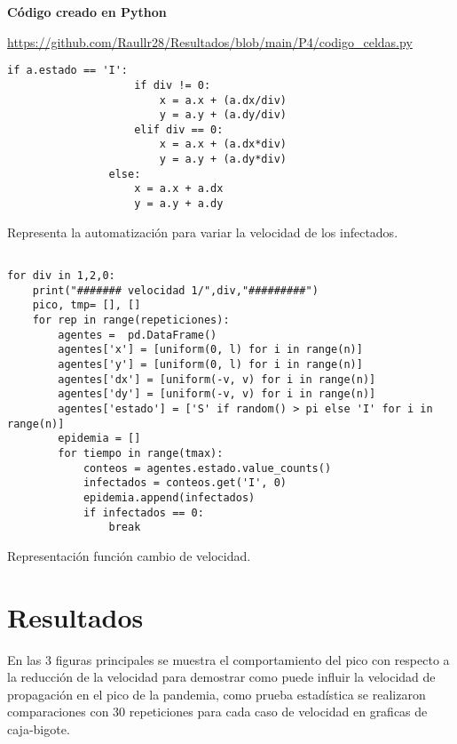 \documentclass{article}
\begin{document}
{\bf Código creado en Python}

\url{https://github.com/Raullr28/Resultados/blob/main/P4/codigo_celdas.py}

\renewcommand{\listingscaption}{Código}

\begin{listing}[H]
\begin{verbatim}
if a.estado == 'I':
                    if div != 0:
                        x = a.x + (a.dx/div)
                        y = a.y + (a.dy/div)
                    elif div == 0:
                        x = a.x + (a.dx*div)
                        y = a.y + (a.dy*div)
                else:
                    x = a.x + a.dx
                    y = a.y + a.dy

  \end{verbatim}
  \label{lst:fibo}
  \caption{Representa la automatización para variar la velocidad de los infectados.}
  
  
\end{listing}
\renewcommand{\listingscaption}{Código}
\begin{listing}[H]

\begin{verbatim}
 
for div in 1,2,0:
    print("####### velocidad 1/",div,"#########")
    pico, tmp= [], []
    for rep in range(repeticiones):
        agentes =  pd.DataFrame()
        agentes['x'] = [uniform(0, l) for i in range(n)]
        agentes['y'] = [uniform(0, l) for i in range(n)]
        agentes['dx'] = [uniform(-v, v) for i in range(n)]
        agentes['dy'] = [uniform(-v, v) for i in range(n)]
        agentes['estado'] = ['S' if random() > pi else 'I' for i in range(n)]
        epidemia = []
        for tiempo in range(tmax):
            conteos = agentes.estado.value_counts()
            infectados = conteos.get('I', 0)
            epidemia.append(infectados)
            if infectados == 0:
                break
  \end{verbatim}
  \label{lst:fibo}
  \caption{Representación función cambio de velocidad.}
\end{listing}

\section{Resultados}
En las 3 figuras principales se muestra el comportamiento del pico con respecto a la reducción de la velocidad para demostrar como puede influir la velocidad de propagación en el pico de la pandemia, como prueba estadística se realizaron comparaciones con 30 repeticiones para cada caso de velocidad en graficas de caja-bigote.
\end{document}
